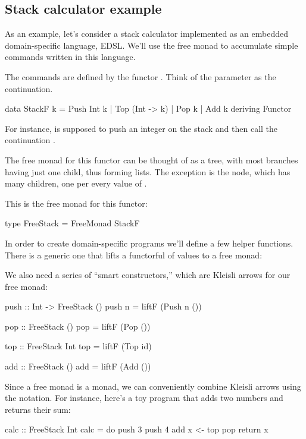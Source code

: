 \documentclass[DaoFP]{subfiles}
\begin{document}
\subsection{Stack calculator example}
As an example, let's consider a stack calculator implemented as an embedded domain-specific language, EDSL. We'll use the free monad to accumulate simple commands written in this language. 

The commands are defined by the functor . Think of the parameter   as the continuation. 
\begin{haskell}
data StackF k  = Push Int k
               | Top (Int -> k)
               | Pop k            
               | Add k
               deriving Functor
\end{haskell}
For instance,  is supposed to push an integer on the stack and then call the continuation .

The free monad for this functor can be thought of as a tree, with most branches having just one child, thus forming lists. The exception is the  node, which has many children, one per every value of .

This is the free monad for this functor:
\begin{haskell}
type FreeStack = FreeMonad StackF
\end{haskell}

In order to create domain-specific programs we'll define a few helper functions. There is a generic one that lifts a functorful of values to a free monad:
We also need a series of ``smart constructors,'' which are Kleisli arrows for our free monad:
\begin{haskell}
push :: Int -> FreeStack ()
push n = liftF (Push n ())

pop :: FreeStack ()
pop = liftF (Pop ())

top :: FreeStack Int
top = liftF (Top id)

add :: FreeStack ()
add = liftF (Add ())
\end{haskell}

Since a free monad is a monad, we can conveniently combine Kleisli arrows using the  notation. For instance, here's a toy program that adds two numbers and returns their sum:
\begin{haskell}
calc :: FreeStack Int
calc = do
  push 3
  push 4
  add
  x <- top
  pop
  return x
\end{haskell}
\end{document}
